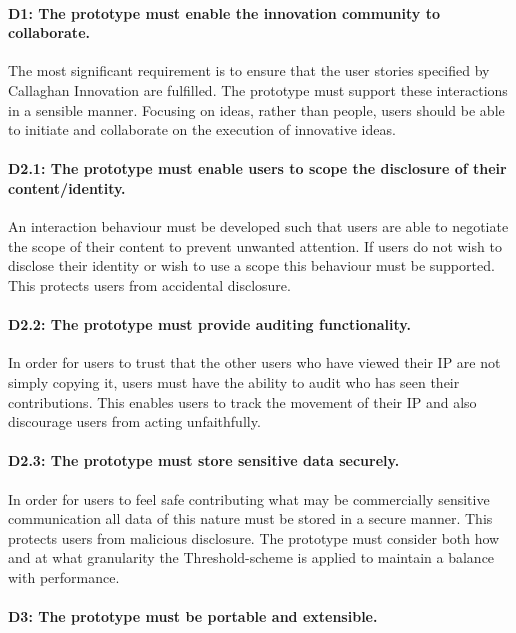\paragraph{D1: The prototype must enable the innovation community to collaborate.}

The most significant requirement is to ensure that the user stories specified by Callaghan Innovation are fulfilled. The prototype must support these interactions in a sensible manner. Focusing on ideas, rather than people, users should be able to initiate and collaborate on the execution of innovative ideas.

\paragraph{D2.1:  The prototype must enable users to scope the disclosure of their content/identity.}

An interaction behaviour must be developed such that users are able to negotiate the scope of their content to prevent unwanted attention. If users do not wish to disclose their identity or wish to use a scope this behaviour must be supported. This protects users from accidental disclosure.

\paragraph{D2.2: The prototype must provide auditing functionality.}

In order for users to trust that the other users who have viewed their IP are not simply copying it, users must have the ability to audit who has seen their contributions. This enables users to track the movement of their IP and also discourage users from acting unfaithfully.

\paragraph{D2.3: The prototype must store sensitive data securely.}

In order for users to feel safe contributing what may be commercially sensitive communication all data of this nature must be stored in a secure manner. This protects users from malicious disclosure. The prototype must consider both how and at what granularity the Threshold-scheme is applied to maintain a balance with performance.

\paragraph{D3:  The prototype must be portable and extensible.}

